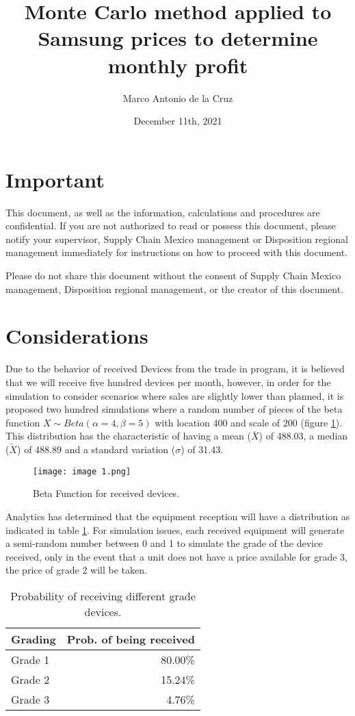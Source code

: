 \documentclass[11pt,a4paper,twocolumn]{article}
\author{Marco Antonio de la Cruz}
\title{Monte Carlo method applied to Samsung prices to determine monthly profit}
\date{December 11th, 2021}
\begin{document}
\maketitle
\section{Important}
This document, as well as the information, calculations and procedures are confidential. If you are not authorized to read or possess this document, please notify your supervisor, Supply Chain Mexico management or Disposition regional management immediately for instructions on how to proceed with this document.

Please do not share this document without the consent of Supply Chain Mexico management, Disposition regional management, or the creator of this document.

\section{Considerations}
Due to the behavior of received Devices from the trade in program, it is believed that we will receive five hundred devices per month, however, in order for the simulation to consider scenarios where sales are slightly lower than planned, it is proposed two hundred simulations where a random number of pieces of the beta function $X \sim Beta(\alpha= 4, \beta = 5)$ with location 400 and scale of 200 (figure \ref{fig:image 1}). This distribution has the characteristic of having a mean ($\overline{X}$) of 488.03, a median ($\widetilde{X}$) of 488.89 and a standard variation ($\sigma$) of 31.43.

\begin{figure}[htb]
\centering
\caption{Beta Function for received devices.}
\texttt{[image: image 1.png]}
\label{fig:image 1}
\end{figure} 

Analytics has determined that the equipment reception will have a distribution as indicated in table \ref{tbl:table 1}. For simulation issues, each received equipment will generate a semi-random number between 0 and 1 to simulate the grade of the device received, only in the event that a unit does not have a price available for grade 3, the price of grade 2 will be taken.

\begin{table}
\centering
\caption{Probability of receiving different grade devices.}
\label{tbl:table 1}
\begin{tabular}{lr}
\toprule
Grading & Prob. of being received \\
\midrule
Grade 1 & 80.00\% \\
Grade 2 & 15.24\% \\
Grade 3 & 4.76\% \\
\bottomrule
\end{tabular}
\end{table}
\end{document}
